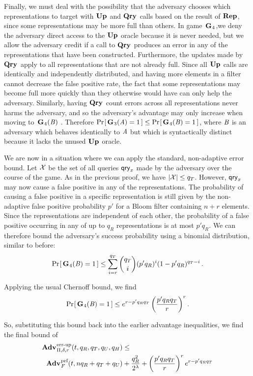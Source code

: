 Finally, we must deal with the possibility that the adversary chooses which
representations to target with $\textup{\textbf{Up}}\hspace{0.5pt}$ and $\textup{\textbf{Qry}}\hspace{0.5pt}$ calls based on the result of
$\textup{\textbf{Rep}}\hspace{0.5pt}$, since some representations may be more full than others. In
game~$\textup{\textbf{G}}\hspace{0.5pt}_4$,we deny the adversary direct access to the $\textup{\textbf{Up}}\hspace{0.5pt}$ oracle
because it is never needed, but we allow the adversary credit if a call to
$\textup{\textbf{Qry}}\hspace{0.5pt}$ produces an error in any of the representations that have been
constructed. Furthermore, the updates made by $\textup{\textbf{Qry}}\hspace{0.5pt}$ apply to all
representations that are not already full. Since all $\textup{\textbf{Up}}\hspace{0.5pt}$ calls are
identically and independently distributed, and having more elements in a filter
cannot decrease the false positive rate, the fact that some representations may
become full more quickly than they otherwise would have can only help the
adversary. Similarly, having $\textup{\textbf{Qry}}\hspace{0.5pt}$ count errors across all representations
never harms the adversary, and so the adversary's advantage may only increase
when moving to~$\textup{\textbf{G}}\hspace{0.5pt}_4(\mathit{B})$ . Therefore $\Pr\hspace{-1pt}\left[\,\textup{\textbf{G}}\hspace{0.5pt}_3(\mathit{A}) = 1\,\right] \le
\Pr\hspace{-1pt}\left[\,\textup{\textbf{G}}\hspace{0.5pt}_4(\mathit{B}) = 1\,\right]$, where $\mathit{B}$ is an adversary which behaves
identically to $\mathit{A}$ but which is syntactically distinct because it lacks the
unused $\textup{\textbf{Up}}\hspace{0.5pt}$ oracle.
%

We are now in a situation where we can apply the standard, non-adaptive error
bound. Let $\mathcal{X}$ be the set of all queries $\mathsf{qry}_x$ made by the adversary over
the course of the game. As in the previous proof, we have $|\mathcal{X}| \le q_T$.
However, $\mathsf{qry}_x$ may now cause a false positive in any of the representations.
The probability of causing a false positive in a specific representation is
still given by the non-adaptive false positive probability $p'$ for a Bloom
filter containing $n+r$ elements. Since the representations are independent of
each other, the probability of a false positive occurring in any of up to $q_R$
representations is at most $p'q_R$. We can therefore bound the adversary's
success probability using a binomial distribution, similar to before:
\begin{equation}
   \Pr\hspace{-1pt}\left[\,\textup{\textbf{G}}\hspace{0.5pt}_4(\mathit{B})=1\,\right] \le
     \sum_{i=r}^{q_T} \binom{q_T}{i}(p'q_R)^i(1-p'q_R)^{q_T-i} \,.
\end{equation}

Applying the usual Chernoff bound, we find
\begin{equation}
   \Pr\hspace{-1pt}\left[\,\textup{\textbf{G}}\hspace{0.5pt}_4(\mathit{B})=1\,\right] \le
     e^{r-p'q_Rq_T}\left(\frac{p'q_Rq_T}{r}\right)^r.
\end{equation}

So, substituting this bound back into the earlier advantage inequalities, we find the final bound of
\begin{equation*}
  \begin{aligned}
    \Adv{\errep}_{\Pi,\delta,r}(t, q_R,q_T,q_U,q_H) &\leq \\
      \Adv{\prf}_F(t,nq_R+q_T+q_U) & +
    \frac{q_R^2}{2^\lambda} +
    \left(\frac{p'q_Rq_T}{r}\right)^re^{r-p'q_Rq_T}
  \end{aligned}
\end{equation*}